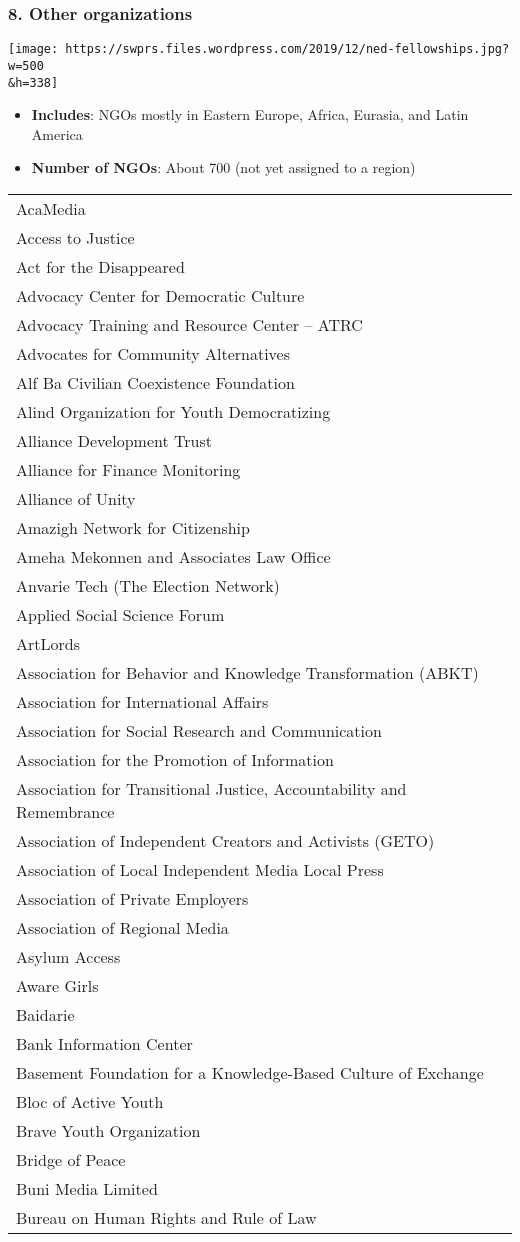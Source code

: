\hypertarget{8-other-organizations}{%
\subsubsection{8. Other organizations}\label{8-other-organizations}}

\texttt{[image: https://swprs.files.wordpress.com/2019/12/ned-fellowships.jpg?w=500\\\&h=338]}

\begin{itemize}
\tightlist
\item
  \textbf{Includes}: NGOs mostly in Eastern Europe, Africa, Eurasia, and
  Latin America
\item
  \textbf{Number of NGOs}: About 700 (not yet assigned to a region)
\end{itemize}

\begin{longtable}[]{@{}l@{}}
\toprule
\endhead
AcaMedia\tabularnewline
Access to Justice\tabularnewline
Act for the Disappeared\tabularnewline
Advocacy Center for Democratic Culture\tabularnewline
Advocacy Training and Resource Center -- ATRC\tabularnewline
Advocates for Community Alternatives\tabularnewline
Alf Ba Civilian Coexistence Foundation\tabularnewline
Alind Organization for Youth Democratizing\tabularnewline
Alliance Development Trust\tabularnewline
Alliance for Finance Monitoring\tabularnewline
Alliance of Unity\tabularnewline
Amazigh Network for Citizenship\tabularnewline
Ameha Mekonnen and Associates Law Office\tabularnewline
Anvarie Tech (The Election Network)\tabularnewline
Applied Social Science Forum\tabularnewline
ArtLords\tabularnewline
Association for Behavior and Knowledge Transformation
(ABKT)\tabularnewline
Association for International Affairs\tabularnewline
Association for Social Research and Communication\tabularnewline
Association for the Promotion of Information\tabularnewline
Association for Transitional Justice, Accountability and
Remembrance\tabularnewline
Association of Independent Creators and Activists (GETO)\tabularnewline
Association of Local Independent Media Local Press\tabularnewline
Association of Private Employers\tabularnewline
Association of Regional Media\tabularnewline
Asylum Access\tabularnewline
Aware Girls\tabularnewline
Baidarie\tabularnewline
Bank Information Center\tabularnewline
Basement Foundation for a Knowledge-Based Culture of
Exchange\tabularnewline
Bloc of Active Youth\tabularnewline
Brave Youth Organization\tabularnewline
Bridge of Peace\tabularnewline
Buni Media Limited\tabularnewline
Bureau on Human Rights and Rule of Law\tabularnewline

\end{longtable}
